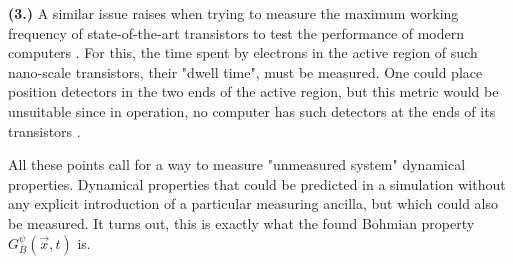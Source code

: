 \documentclass[11pt, a4paper]{article} %
\begin{document}
{\bf (3.)} A similar issue raises when trying to measure the maximum working frequency of state-of-the-art transistors to test the performance of modern computers \cite{modern}. For this, the time spent by electrons in the active region of such nano-scale transistors, their "dwell time", must be measured. One could place position detectors in the two ends of the active region, but this metric would be unsuitable since in operation, no computer has such detectors at the ends of its transistors \cite{tunnel1, tunnel2}.

All these points call for a way to measure "unmeasured system" dynamical properties. Dynamical properties that could be predicted in a simulation without any explicit introduction of a particular measuring ancilla, but which could also be measured. It turns out, this is exactly what the found Bohmian property $G^\psi_B(\vec{x},t)$ is.
\end{document}
